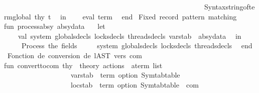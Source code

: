 \begin{isabellebody}
\ \ \ \ \ \ \ \ \ \ \ \ \ \ \ \ \ \ \ \ \ \ \ \ \ \ \ \ \ \ \ \ \ \ \ \ \ \ \ \ \ \ \ \ \ \ \ \ \ \ \ \ \ \ \ \ \ {\isacharparenleft}{\kern0pt}{\isacharasterisk}{\kern0pt}Syntax{\isachardot}{\kern0pt}string{\isacharunderscore}{\kern0pt}of{\isacharunderscore}{\kern0pt}term{\isacharunderscore}{\kern0pt}global\ thy\ t{\isacharparenright}{\kern0pt}{\isacharasterisk}{\kern0pt}{\isacharparenright}{\kern0pt}\isanewline
\ \ in\isanewline
\ \ \ \ eval\ term\isanewline
\ \ end\isanewline
{\isacharparenleft}{\kern0pt}{\isacharasterisk}{\kern0pt}\ Fixed\ record\ pattern\ matching\ {\isacharasterisk}{\kern0pt}{\isacharparenright}{\kern0pt}\isanewline
{\isacharparenleft}{\kern0pt}{\isacharasterisk}{\kern0pt}fun\ process{\isacharunderscore}{\kern0pt}absy\ absy{\isacharunderscore}{\kern0pt}data\ {\isacharequal}{\kern0pt}\isanewline
\ \ let\isanewline
\ \ \ \ val\ {\isacharbraceleft}{\kern0pt}system{\isacharcomma}{\kern0pt}\ globals{\isacharunderscore}{\kern0pt}decls{\isacharcomma}{\kern0pt}\ locks{\isacharunderscore}{\kern0pt}decls{\isacharcomma}{\kern0pt}\ threads{\isacharunderscore}{\kern0pt}decls{\isacharcomma}{\kern0pt}\ varstab{\isacharbraceright}{\kern0pt}\ {\isacharequal}{\kern0pt}\ absy{\isacharunderscore}{\kern0pt}data\isanewline
\ \ in\isanewline
\ \ \ \ {\isacharparenleft}{\kern0pt}{\isacharasterisk}{\kern0pt}\ Process\ the\ fields\ {\isacharasterisk}{\kern0pt}{\isacharparenright}{\kern0pt}\isanewline
\ \ \ \ {\isacharparenleft}{\kern0pt}system{\isacharcomma}{\kern0pt}\ globals{\isacharunderscore}{\kern0pt}decls{\isacharcomma}{\kern0pt}\ locks{\isacharunderscore}{\kern0pt}decls{\isacharcomma}{\kern0pt}\ threads{\isacharunderscore}{\kern0pt}decls{\isacharparenright}{\kern0pt}\isanewline
\ \ end\isanewline
{\isacharasterisk}{\kern0pt}{\isacharparenright}{\kern0pt}\isanewline
{\isacharparenleft}{\kern0pt}{\isacharasterisk}{\kern0pt}\ Fonction\ de\ conversion\ de\ l{\isacharprime}{\kern0pt}AST\ vers\ com\ {\isacharasterisk}{\kern0pt}{\isacharparenright}{\kern0pt}\isanewline
fun\ convert{\isacharunderscore}{\kern0pt}to{\isacharunderscore}{\kern0pt}com\ {\isacharparenleft}{\kern0pt}thy\ {\isacharcolon}{\kern0pt}\ theory{\isacharparenright}{\kern0pt}\ {\isacharparenleft}{\kern0pt}actions\ {\isacharcolon}{\kern0pt}\ a{\isacharunderscore}{\kern0pt}term\ list{\isacharparenright}{\kern0pt}\ \isanewline
\ \ \ \ \ \ \ \ \ \ \ \ \ \ \ \ \ \ \ {\isacharparenleft}{\kern0pt}varstab\ {\isacharcolon}{\kern0pt}\ {\isacharparenleft}{\kern0pt}term\ option{\isacharparenright}{\kern0pt}\ Symtab{\isachardot}{\kern0pt}table{\isacharparenright}{\kern0pt}\ \isanewline
\ \ \ \ \ \ \ \ \ \ \ \ \ \ \ \ \ \ \ {\isacharparenleft}{\kern0pt}locstab\ {\isacharcolon}{\kern0pt}\ {\isacharparenleft}{\kern0pt}term\ option{\isacharparenright}{\kern0pt}\ Symtab{\isachardot}{\kern0pt}table{\isacharparenright}{\kern0pt}\ {\isacharcolon}{\kern0pt}\ com\ {\isacharequal}{\kern0pt}\isanewline

\end{isabellebody}

